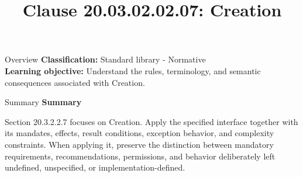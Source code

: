 \documentclass[10pt,letterpaper]{article}
\title{Clause 20.03.02.02.07: Creation}
\author{}
\date{}
\begin{document}
\maketitle
\begin{CornellOverviewBox}{Overview}
\textbf{Classification:} Standard library - Normative\\[2pt]
\textbf{Learning objective:} Understand the rules, terminology, and semantic consequences associated with Creation.
\end{CornellOverviewBox}\begin{CornellSummaryBox}{Summary}
{\sffamily\bfseries\color{Accent} Summary}\par\vspace{3pt}Section 20.3.2.2.7 focuses on Creation. Apply the specified interface together with its mandates, effects, result conditions, exception behavior, and complexity constraints. When applying it, preserve the distinction between mandatory requirements, recommendations, permissions, and behavior deliberately left undefined, unspecified, or implementation-defined.
\end{CornellSummaryBox}
\end{document}
